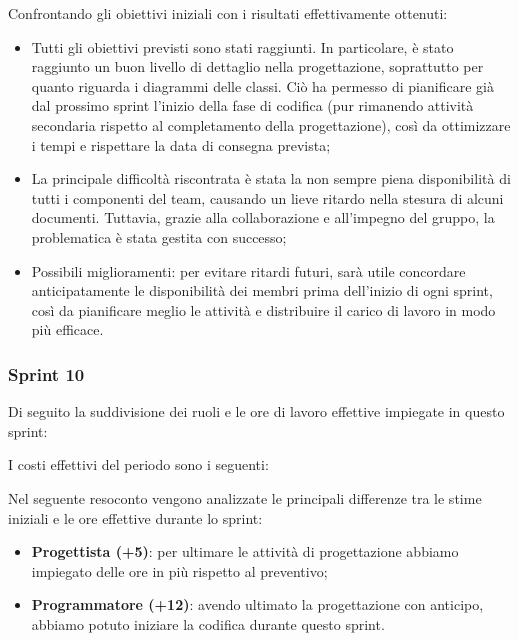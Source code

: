 

Confrontando gli obiettivi iniziali con i risultati effettivamente ottenuti:
\begin{itemize}
\item Tutti gli obiettivi previsti sono stati raggiunti. In particolare, è stato raggiunto un buon livello di dettaglio nella progettazione, soprattutto per quanto riguarda i diagrammi delle classi. Ciò ha permesso di pianificare già dal prossimo sprint l’inizio della fase di codifica (pur rimanendo attività secondaria rispetto al completamento della progettazione), così da ottimizzare i tempi e rispettare la data di consegna prevista;
\item La principale difficoltà riscontrata è stata la non sempre piena disponibilità di tutti i componenti del team, causando un lieve ritardo nella stesura di alcuni documenti. Tuttavia, grazie alla collaborazione e all’impegno del gruppo, la problematica è stata gestita con successo;
\item Possibili miglioramenti: per evitare ritardi futuri, sarà utile concordare anticipatamente le disponibilità dei membri prima dell'inizio di ogni sprint, così da pianificare meglio le attività e distribuire il carico di lavoro in modo più efficace.
\end{itemize}

\subsubsection{Sprint 10}
Di seguito la suddivisione dei ruoli e le ore di lavoro effettive impiegate in questo sprint:



I costi effettivi del periodo sono i seguenti:



Nel seguente resoconto vengono analizzate le principali differenze tra le stime iniziali e le ore effettive durante lo sprint:
\begin{itemize}
    \item \textbf{Progettista (+5)}: per ultimare le attività di progettazione abbiamo impiegato delle ore in più rispetto al preventivo;
    \item \textbf{Programmatore (+12)}: avendo ultimato la progettazione con anticipo, abbiamo potuto iniziare la codifica durante questo sprint.
\end{itemize}

